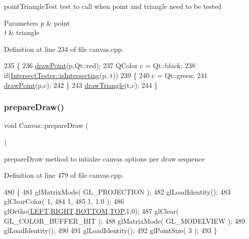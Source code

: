 point\+Triangle\+Test test to call when point and triangle need to be tested 


\begin{DoxyParams}{Parameters}
{\em p} & point \\
\hline
{\em t} & triangle \\
\hline
\end{DoxyParams}


Definition at line 234 of file canvas.\+cpp.


\begin{DoxyCode}
235 \{
236     \hyperlink{class_canvas_ad7cf8e6e93765586808ac744d888dbdc}{drawPoint}(p,Qt::red);
237     QColor c = Qt::black;
238     \textcolor{keywordflow}{if}(\hyperlink{class_intersect_tester_a7710e17ff7d2e229059f23b9429213f5}{IntersectTester::isIntersecting}(p, t))
239     \{
240         c = Qt::green;
241         \hyperlink{class_canvas_ad7cf8e6e93765586808ac744d888dbdc}{drawPoint}(p,c);
242     \}
243     \hyperlink{class_canvas_a74dd9cf1e8f3b48e2df2b34886770ac6}{drawTriangle}(t,c);
244 \}
\end{DoxyCode}
\mbox{\label{class_canvas_a0b546aa7d55d00f82b4db59ab4ab9cee}} 
\subsubsection{\texorpdfstring{prepare\+Draw()}{prepareDraw()}}
{\footnotesize\ttfamily void Canvas\+::prepare\+Draw (\begin{DoxyParamCaption}{ }\end{DoxyParamCaption})\hspace{0.3cm}{\ttfamily [private]}}



prepare\+Draw method to intialze canvas options per draw sequence 



Definition at line 479 of file canvas.\+cpp.


\begin{DoxyCode}
480 \{
481     glMatrixMode( GL\_PROJECTION );
482     glLoadIdentity();
483     glClearColor( 1,
484                   1,
485                   1, 1.0 );
486     glOrtho(\hyperlink{class_canvas_a7da74603fc4232dfe00be701878d048b}{LEFT},\hyperlink{class_canvas_ab618bb921e1c0ee7c394fe3a83b17271}{RIGHT},\hyperlink{class_canvas_a0630c650c5daea2db5a01ce6c0954457}{BOTTOM},\hyperlink{class_canvas_a3d5a1c71903689cf817cd92ae7a2ebc9}{TOP},1,0);
487     glClear( GL\_COLOR\_BUFFER\_BIT );
488     glMatrixMode( GL\_MODELVIEW );
489     glLoadIdentity();
490 
491     glLoadIdentity();
492     glPointSize( 3 );
493 \}
\end{DoxyCode}
\mbox{\label{class_canvas_a104679999425d8ffdc27454b71e5e1e3}} 
